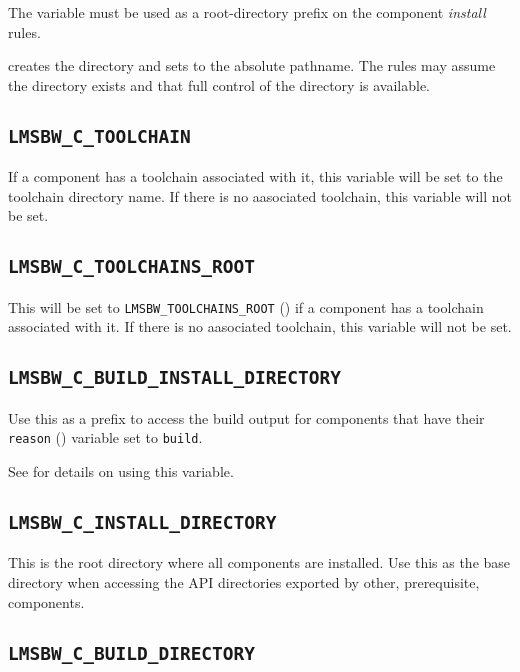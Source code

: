 The \destdir variable must be used as a root-directory prefix on the
component \emph{install} rules.

\lmsbw creates the directory and sets \destdir to the absolute
pathname.  The rules may assume the directory exists and that full
control of the directory is available.


\subsection{\texttt{LMSBW\_C\_TOOLCHAIN}}\label{wrap:lmsbw-c-toolchain}

If a component has a toolchain associated with it, this variable will
be set to the toolchain directory name.  If there is no aasociated
toolchain, this variable will not be set.

\subsection{\texttt{LMSBW\_C\_TOOLCHAINS\_ROOT}}\label{wrap:lmsbw-c-toolchains-root}

This will be set to \texttt{LMSBW\_TOOLCHAINS\_ROOT}
() if a component has a toolchain
associated with it.  If there is no aasociated toolchain, this
variable will not be set.

\subsection{\texttt{LMSBW\_C\_BUILD\_INSTALL\_DIRECTORY}}\label{wrap:build-install-directory}

Use this as a prefix to access the build output for components that
have their \texttt{reason} () variable set to
\texttt{build}.

See  for details on using this variable.

\subsection{\texttt{LMSBW\_C\_INSTALL\_DIRECTORY}}

This is the root directory where all components are installed.  Use
this as the base directory when accessing the API directories exported
by other, prerequisite, components.

\subsection{\texttt{LMSBW\_C\_BUILD\_DIRECTORY}}\label{wrap:lmsbw-c-build-directory}

